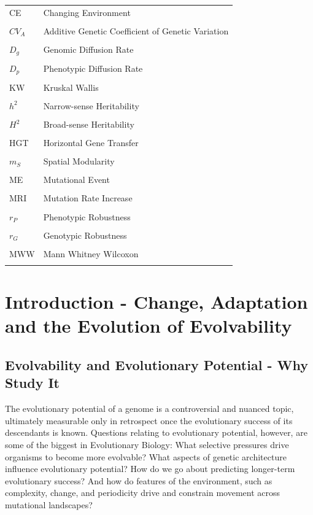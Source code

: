 \documentclass[PhD]{msu-thesis}
\begin{document}
\begin{table}[ht]
\begin{tabularx}{\textwidth}{lX}
{CE} & Changing Environment \\
\\
{$CV_A$} & Additive Genetic Coefficient of Genetic Variation \\
\\
{$D_g$} & Genomic Diffusion Rate \\
\\
{$D_p$} & Phenotypic Diffusion Rate \\
\\
{KW} & Kruskal Wallis \\
\\
{$h^2$} & Narrow-sense Heritability \\
\\
{$H^2$} & Broad-sense Heritability \\
\\
{HGT} & Horizontal Gene Transfer \\
\\
{$m_S$} & Spatial Modularity \\
\\
{ME} & Mutational Event \\
\\
{MRI} & Mutation Rate Increase \\
\\
{$r_P$} & Phenotypic Robustness \\
\\
{$r_G$} & Genotypic Robustness \\
\\
{MWW} & Mann Whitney Wilcoxon \\
\\

\end{tabularx}
\end{table}
%
\clearpage
\todototoc
\listoftodos
%
\mainmatter
\chapter{Introduction - Change, Adaptation and the Evolution of Evolvability}
\label{chap:introduction}
\section{Evolvability and Evolutionary Potential - Why Study It} 
The evolutionary potential of a genome is a controversial and nuanced topic, ultimately measurable only in retrospect once the evolutionary success of its descendants is known. Questions relating to evolutionary potential, however, are some of the biggest in Evolutionary Biology: What selective pressures drive organisms to become more evolvable? What aspects of genetic architecture influence evolutionary potential? How do we go about predicting longer-term evolutionary success? And how do features of the environment, such as complexity, change, and periodicity drive and constrain movement across mutational landscapes?
\end{document}
